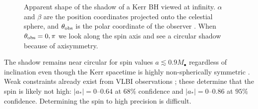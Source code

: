 \begin{figure}%
  \begin{center}
    \quad
    \quad
    \\
    \quad
    \quad
    \\
    \quad  
    \caption{Apparent shape of the shadow of a Kerr BH viewed at infinity. $\alpha$ and $\beta$ are the position coordinates projected onto the celestial sphere, and $\theta_\mathrm{obs}$ is the polar coordinate of the observer \citep[section 63]{Chandrasekhar1992}. When $\theta_\mathrm{obs} = 0, \pi$ we look along the spin axis and see a circular shadow because of axisymmetry.} 
    \label{fig:Shadow}
  \end{center}
\end{figure}
The shadow remains near circular for spin values $a \lesssim 0.9 M_\bullet$ regardless of inclination even though the Kerr spacetime is highly non-spherically symmetric \citep{Johannsen2010b}. Weak constraints already exist from VLBI observations \citep{Broderick2009a,Broderick2011}; these determine that the spin is likely not high: $|a_\ast| = 0$--$0.64$ at $68\%$ confidence and $|a_\ast| = 0$--$0.86$ at $95\%$ confidence. Determining the spin to high precision is difficult. 

